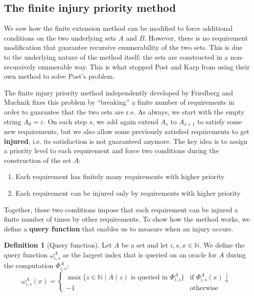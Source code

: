 \documentclass[12pt,a4paper]{article}
\theoremstyle{definition}
\newtheorem{definition}{Definition}
\newcommand{\curlyquotes}[1]{\textquotedblleft #1\textquotedblright}
\newcommand{\N}{\mathbb{N}}                     %
\begin{document}
    \subsection{The finite injury priority method}

    We saw how the finite extension method can be modified to force additional conditions on the two underlying sets $A$ and $B$. However, there is no requirement modification that guarantee recursive enumerability of the two sets. This is due to the underlying nature of the method itself: the sets are constructed in a non-recursively enumerable way. This is what stopped Post and Karp from using their own method to solve Post's problem.
    
    The finite injury priority method independently developed by Friedberg and Muchnik fixes this problem by \curlyquotes{breaking} a finite number of requirements in order to guarantee that the two sets are r.e. As always, we start with the empty string $A_0 = \varepsilon$. On each step $s$, we add again extend $A_s$ to $A_{s+1}$ to satisfy some new requirements, but we also allow some previously satisfied requirements to get \textbf{injured}, i.e. its satisfaction is not guaranteed anymore. The key idea is to assign a priority level to each requirement and force two conditions during the construction of the set $A$:
    \begin{enumerate}
        \item Each requirement has finitely many requirements with higher priority
        \item Each requirement can be injured only by requirements with higher priority 
    \end{enumerate}

    Together, these two conditions impose that each requirement can be injured a finite number of times by other requirements. To show how the method works, we define a \textbf{query function} that enables us to measure when an injury occurs. 

    \begin{definition}[Query function]
        Let $A$ be a set and let $i,s,x \in \N$. We define the query function $\omega_{i,s}^A$ as the largest index that is queried on an oracle for $A$ during the computation $\Phi_{i,s}^A$:
        \[\omega_{i,s}^A(x) = \left \{ \begin{array}{ll}
            \max \{z \in \N \mid A(z) \text{ is queried in } \Phi_{i,s}^A\} & \text{if } \Phi_{i,s}^A(x) \downarrow \\
            -1 & \text{otherwise}
        \end{array}\right .\]
    \end{definition}
\end{document}

